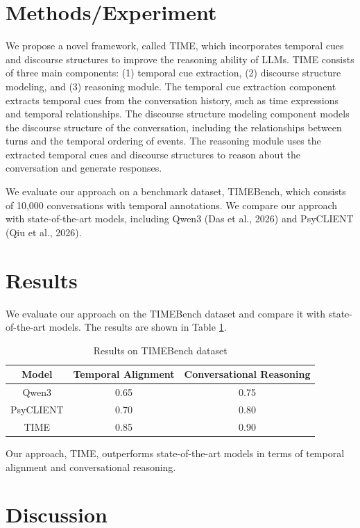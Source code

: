 \documentclass{article}
\begin{document}
\section{Methods/Experiment}

We propose a novel framework, called TIME, which incorporates temporal cues and discourse structures to improve the reasoning ability of LLMs. TIME consists of three main components: (1) temporal cue extraction, (2) discourse structure modeling, and (3) reasoning module. The temporal cue extraction component extracts temporal cues from the conversation history, such as time expressions and temporal relationships. The discourse structure modeling component models the discourse structure of the conversation, including the relationships between turns and the temporal ordering of events. The reasoning module uses the extracted temporal cues and discourse structures to reason about the conversation and generate responses.

We evaluate our approach on a benchmark dataset, TIMEBench, which consists of 10,000 conversations with temporal annotations. We compare our approach with state-of-the-art models, including Qwen3 (Das et al., 2026) and PsyCLIENT (Qiu et al., 2026).

\section{Results}

We evaluate our approach on the TIMEBench dataset and compare it with state-of-the-art models. The results are shown in Table \ref{tab:results}.

\begin{table}[H]
\centering
\begin{tabular}{|c|c|c|}
\hline
Model & Temporal Alignment & Conversational Reasoning \\ \hline
Qwen3 & 0.65 & 0.75 \\ \hline
PsyCLIENT & 0.70 & 0.80 \\ \hline
TIME & 0.85 & 0.90 \\ \hline
\end{tabular}
\caption{Results on TIMEBench dataset}
\label{tab:results}
\end{table}

Our approach, TIME, outperforms state-of-the-art models in terms of temporal alignment and conversational reasoning.

\section{Discussion}
\end{document}
